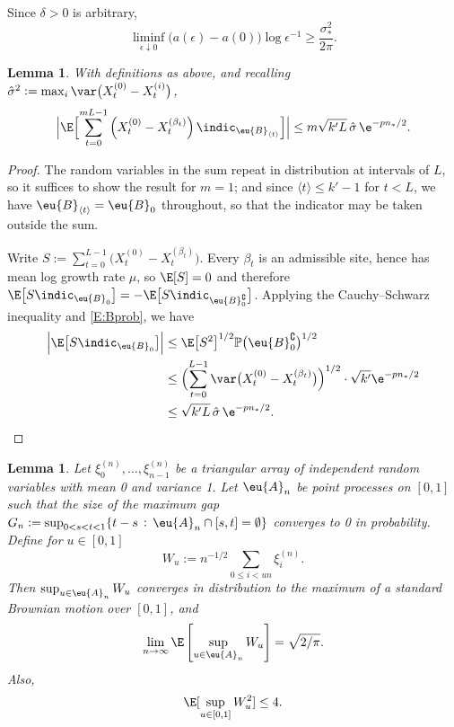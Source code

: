 \documentclass[11pt]{amsart}
\newtheorem{lemma}[Thm]{Lemma}
\renewcommand{\P}{\mathbb{P}}
\begin{document}
Since $\delta>0$ is arbitrary,
$$
\liminf_{\epsilon\downarrow 0} \bigl( a(\epsilon)-a(0)\bigr) \log\epsilon^{-1}
\ge \frac{\sigma_*^2}{2\pi} .
$$

\begin{lemma} 	\label{L:Yml}
	With definitions as above, and recalling ${\hat\sigma^2 :=\max_i \var\bigl(X_t^{(0)}-X_t^{(i)}\bigr)}$,
	$$
	\Bigl|\E\Bigl[\sum_{t=0}^{mL-1} \left( X^{(0)}_{t} - X^{(\beta_{t})}_{t} \right) \indic_{\eu{B}_{\langle t \rangle}} \Bigr] \Bigr|
	\le m\sqrt{k'L}\, \hat\sigma\, \e^{-p n_*/2} .
	$$
\end{lemma}
\begin{proof}
	The random variables in the sum repeat in distribution at intervals of $L$, so it
	suffices to show the result for $m=1$; and since $\langle t\rangle\le k'-1$ for $t<L$,
	we have $\eu{B}_{\langle t\rangle}=\eu{B}_0$ throughout, so that the indicator may be taken
	outside the sum.
	
	Write $S:=\sum_{t=0}^{L-1}\bigl( X^{(0)}_{t} - X^{(\beta_{t})}_{t}\bigr)$.
	Every $\beta_t$ is an admissible site, hence has mean log growth rate $\mu$, so $\E[S]=0$ and
	therefore $\E\bigl[S\indic_{\eu{B}_{0}}\bigr]=-\E\bigl[S\indic_{\eu{B}_{0}^\complement}\bigr]$.
	Applying the Cauchy--Schwarz inequality and \eqref{E:Bprob}, we have
	\begin{align*}
		\Bigl|	\E\bigl[S \indic_{\eu{B}_{0} } \bigr] \Bigr|
		&\le 	\E\bigl[S^2\bigr]^{1/2} \P\bigl(\eu{B}_{0}^\complement \bigr)^{1/2} \\
		&\le \Bigl(\sum_{t=0}^{L-1} \var\bigl(X_t^{(0)}-X_t^{(\beta_t)}\bigr) \Bigr)^{1/2} \cdot \sqrt{k'}\e^{-p n_*/2}\\
		&\le  \sqrt{k'L}\, \hat\sigma\, \e^{-p n_*/2}.
	\end{align*}
\end{proof}


\begin{lemma} \label{L:invariance}
	Let $\xi_0^{(n)},\dots,\xi_{n-1}^{(n)}$ be a triangular array of independent random variables with
	mean 0 and variance 1. Let $\eu{A}_n$ be point processes on $[0,1]$ such that
	the size of the maximum gap $G_n:= \sup_{0<s<t<1} \{t-s \, : \, \eu{A}_n \cap [s,t] = \emptyset \}$ converges to 0 in probability.
	Define for $u \in [0,1]$
	$$
		W_u := 	n^{-1/2} \sum_{0\le i < un } \xi_i^{(n)}.
	$$
	Then $\sup_{u\in \eu{A}_n} W_u$ converges in distribution to the maximum of a standard
	Brownian motion over $[0,1]$, and
	\begin{equation} \label{E:Wmax}
		\lim_{n\to\infty} \E\left[\sup_{u\in \eu{A}_n} W_u \right] =\sqrt{2/\pi} .
	\end{equation}
	Also,
	\begin{equation} \label{E:Wmax2}
		\E[\sup_{u\in [0,1]} W_u^2 ]\le 4.
	\end{equation}
\end{lemma}
\end{document}
